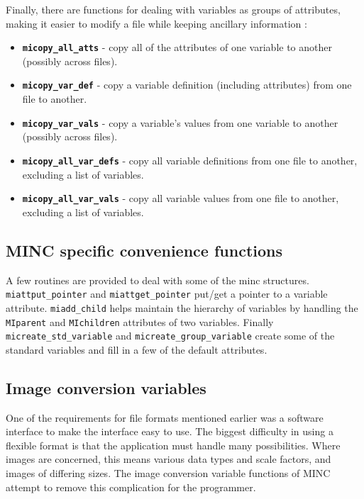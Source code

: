 Finally, there are functions for dealing with variables as groups of
attributes, making it easier to modify a file while keeping ancillary
information :
\begin{itemize}
   \item {\bf \verb+micopy_all_atts+} - copy all of the attributes of
      one variable to another (possibly across files).
   \item {\bf \verb+micopy_var_def+} - copy a variable definition (including
      attributes) from one file to another.
   \item {\bf \verb+micopy_var_vals+} - copy a variable's values from
      one variable to another (possibly across files).
   \item {\bf \verb+micopy_all_var_defs+} - copy all variable
      definitions from one file to another, excluding a list of variables.
   \item {\bf \verb+micopy_all_var_vals+} - copy all variable values
      from one file to another, excluding a list of variables.
\end{itemize}

\subsection{MINC specific convenience functions}

A few routines are provided to deal with some of the minc structures.
\verb+miattput_pointer+ and \verb+miattget_pointer+ put/get a pointer to a
variable attribute. \verb+miadd_child+ helps maintain the hierarchy of
variables by handling the \verb+MIparent+ and \verb+MIchildren+
attributes of two variables. Finally \verb+micreate_std_variable+ and
\verb+micreate_group_variable+ create some of the standard variables
and fill in a few of the default attributes.

\subsection{Image conversion variables}

One of the requirements for file formats mentioned earlier was
a software interface to make the interface easy to use. The biggest
difficulty in using a flexible format is that the application must
handle many possibilities. Where images are concerned, this means
various data types and scale factors, and images of differing sizes.
The image conversion variable functions of MINC attempt to remove this
complication for the programmer.

